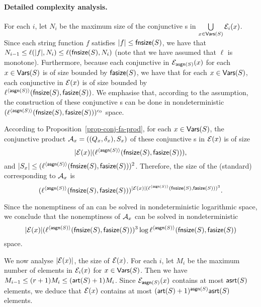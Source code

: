 \paragraph{Detailed complexity analysis.}
For each $i$, 
let $N_i$ be the maximum size of the conjunctive \FA{}s in $\bigcup \limits_{x \in \mathsf{Vars}(S)} \mathcal{E}_i(x)$.
Since each string function $f$ satisfies $|f| \le \mathsf{fnsize}(S)$, we have that $N_{i-1} \le \ell(|f|, N_i) \le \ell(\mathsf{fnsize}(S), N_i)$ (note that we have assumed that $\ell$ is monotone). Furthermore, because each conjunctive \FA{} in $\mathcal{E}_{\mathsf{asgn}(S)}(x)$ for each $x \in \mathsf{Vars}(S)$ is of size bounded by $\mathsf{fasize}(S)$, we have 
    that for each $x \in \mathsf{Vars}(S)$, each conjunctive \FA{} in $\mathcal{E}(x)$ is of
    size bounded by \\ $\ell^{\langle \mathsf{asgn}(S) \rangle}(\mathsf{fnsize}(S), \mathsf{fasize}(S))$. 
%
We emphasise that, according to the \prerec{} assumption, the construction of these conjunctive \FA{}s can be done in nondeterministic $(\ell^{\langle \mathsf{asgn}(S) \rangle}(\mathsf{fnsize}(S), \mathsf{fasize}(S)))^{c_0}$ space. 

According to Proposition~\ref{prop-conj-fa-prod}, for each $x \in \mathsf{Vars}(S)$, the conjunctive product \FA{} $\mathcal{A}_x=((Q_x, \delta_x), S_x)$ of these conjunctive \FA{}s  in $\mathcal{E}(x)$ is of size 
    $$|\mathcal{E}(x)|(\ell^{\langle \mathsf{asgn}(S) \rangle}(\mathsf{fnsize}(S), \mathsf{fasize}(S))),$$
and $|S_x| \le (\ell^{\langle \mathsf{asgn}(S) \rangle}(\mathsf{fnsize}(S), \mathsf{fasize}(S)))^2$. Therefore, the size of the (standard) \FA{} corresponding to $\mathcal{A}_x$ is 
$$(\ell^{\langle \mathsf{asgn}(S) \rangle}(\mathsf{fnsize}(S), \mathsf{fasize}(S)))^{|\mathcal{E}(x)| (\ell^{\langle \mathsf{asgn}(S) \rangle}(\mathsf{fnsize}(S), \mathsf{fasize}(S)))^3}.$$

Since the nonemptiness of an \FA{} can be solved in nondeterministic logarithmic space, we conclude that the nonemptiness of $\mathcal{A}_x$ can be solved in nondeterministic
{\small
$$|\mathcal{E}(x)| (\ell^{\langle \mathsf{asgn}(S) \rangle}(\mathsf{fnsize}(S), \mathsf{fasize}(S)))^3 \log \ell^{\langle \mathsf{asgn}(S) \rangle}(\mathsf{fnsize}(S), \mathsf{fasize}(S))$$
}
space.

We now analyse $|\mathcal{E}(x)|$, the size of $\mathcal{E}(x)$.
For each $i$, let $M_i$ be the maximum number of elements in $\mathcal{E}_i(x)$ for $x  \in \mathsf{Vars}(S)$.
Then we have $M_{i-1} \le (r+1)M_i \le (\mathsf{art}(S)+1)M_i $. Since $\mathcal{E}_{\mathsf{asgn}(S)}(x)$ contains at most $\mathsf{asrt}(S)$ elements, we deduce that $\mathcal{E}(x)$ contains at most $(\mathsf{art}(S)+1)^{\mathsf{asgn}(S)}\mathsf{asrt}(S)$ elements. 

